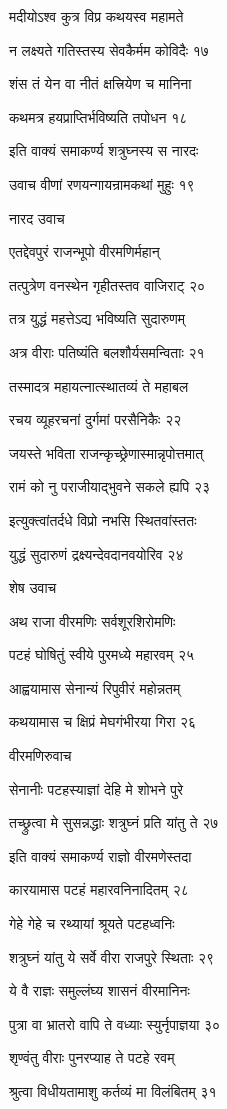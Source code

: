 मदीयोऽश्व कुत्र विप्र कथयस्व महामते

न लक्ष्यते गतिस्तस्य सेवकैर्मम कोविदैः १७

शंस तं येन वा नीतं क्षत्त्रियेण च मानिना

कथमत्र हयप्राप्तिर्भविष्यति तपोधन १८

इति वाक्यं समाकर्ण्य शत्रुघ्नस्य स नारदः

उवाच वीणां रणयन्गायन्रामकथां मुहुः १९

नारद उवाच

एतद्देवपुरं राजन्भूपो वीरमणिर्महान्

तत्पुत्रेण वनस्थेन गृहीतस्तव वाजिराट् २०

तत्र युद्धं महत्तेऽद्य भविष्यति सुदारुणम्

अत्र वीराः पतिष्यंति बलशौर्यसमन्विताः २१

तस्मादत्र महायत्नात्स्थातव्यं ते महाबल

रचय व्यूहरचनां दुर्गमां परसैनिकैः २२

जयस्ते भविता राजन्कृच्छ्रेणास्मान्नृपोत्तमात्

रामं को नु पराजीयाद्भुवने सकले ह्यपि २३

इत्युक्त्वांतर्दधे विप्रो नभसि स्थितवांस्ततः

युद्धं सुदारुणं द्रक्ष्यन्देवदानवयोरिव २४

शेष उवाच

अथ राजा वीरमणिः सर्वशूरशिरोमणिः

पटहं घोषितुं स्वीये पुरमध्ये महारवम् २५

आह्वयामास सेनान्यं रिपुवीरं महोन्नतम्

कथयामास च क्षिप्रं मेघगंभीरया गिरा २६

वीरमणिरुवाच

सेनानीः पटहस्याज्ञां देहि मे शोभने पुरे

तच्छ्रुत्वा मे सुसन्नद्धाः शत्रुघ्नं प्रति यांतु ते २७

इति वाक्यं समाकर्ण्य राज्ञो वीरमणेस्तदा

कारयामास पटहं महारवनिनादितम् २८

गेहे गेहे च रथ्यायां श्रूयते पटहध्वनिः

शत्रुघ्नं यांतु ये सर्वे वीरा राजपुरे स्थिताः २९

ये वै राज्ञः समुल्लंघ्य शासनं वीरमानिनः

पुत्रा वा भ्रातरो वापि ते वध्याः स्युर्नृपाज्ञया ३०

शृण्वंतु वीराः पुनरप्याह ते पटहे रवम्

श्रुत्वा विधीयतामाशु कर्तव्यं मा विलंबितम् ३१

